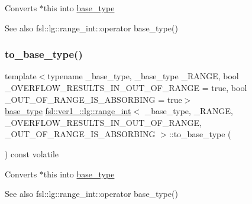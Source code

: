 Converts $\ast$this into \mbox{\hyperlink{classfsl_1_1ver1__0_1_1lg_1_1range__int_af14c814b65a761cd387e7577eb2ef78c}{base\+\_\+type}} \begin{DoxySeeAlso}{See also}
fsl\+::lg\+::range\+\_\+int\+::operator base\+\_\+type() 
\end{DoxySeeAlso}
\mbox{\label{classfsl_1_1ver1__0_1_1lg_1_1range__int_afa20f93fb03e93bc7c3db5b6427e2b68}} 
\subsubsection{\texorpdfstring{to\_base\_type()}{to\_base\_type()}\hspace{0.1cm}{\footnotesize\ttfamily [2/2]}}
{\footnotesize\ttfamily template$<$typename \+\_\+base\+\_\+type, \+\_\+base\+\_\+type \+\_\+\+R\+A\+N\+GE, bool \+\_\+\+O\+V\+E\+R\+F\+L\+O\+W\+\_\+\+R\+E\+S\+U\+L\+T\+S\+\_\+\+I\+N\+\_\+\+O\+U\+T\+\_\+\+O\+F\+\_\+\+R\+A\+N\+GE = true, bool \+\_\+\+O\+U\+T\+\_\+\+O\+F\+\_\+\+R\+A\+N\+G\+E\+\_\+\+I\+S\+\_\+\+A\+B\+S\+O\+R\+B\+I\+NG = true$>$ \\
\mbox{\hyperlink{classfsl_1_1ver1__0_1_1lg_1_1range__int_af14c814b65a761cd387e7577eb2ef78c}{base\+\_\+type}} \mbox{\hyperlink{classfsl_1_1ver1__0_1_1lg_1_1range__int}{fsl\+::ver1\+\_\+::lg\+::range\+\_\+int}}$<$ \+\_\+base\+\_\+type, \+\_\+\+R\+A\+N\+GE, \+\_\+\+O\+V\+E\+R\+F\+L\+O\+W\+\_\+\+R\+E\+S\+U\+L\+T\+S\+\_\+\+I\+N\+\_\+\+O\+U\+T\+\_\+\+O\+F\+\_\+\+R\+A\+N\+GE, \+\_\+\+O\+U\+T\+\_\+\+O\+F\+\_\+\+R\+A\+N\+G\+E\+\_\+\+I\+S\+\_\+\+A\+B\+S\+O\+R\+B\+I\+NG $>$\+::to\+\_\+base\+\_\+type (\begin{DoxyParamCaption}{ }\end{DoxyParamCaption}) const volatile\hspace{0.3cm}{\ttfamily [inline]}}

Converts $\ast$this into \mbox{\hyperlink{classfsl_1_1ver1__0_1_1lg_1_1range__int_af14c814b65a761cd387e7577eb2ef78c}{base\+\_\+type}} \begin{DoxySeeAlso}{See also}
fsl\+::lg\+::range\+\_\+int\+::operator base\+\_\+type() 
\end{DoxySeeAlso}


